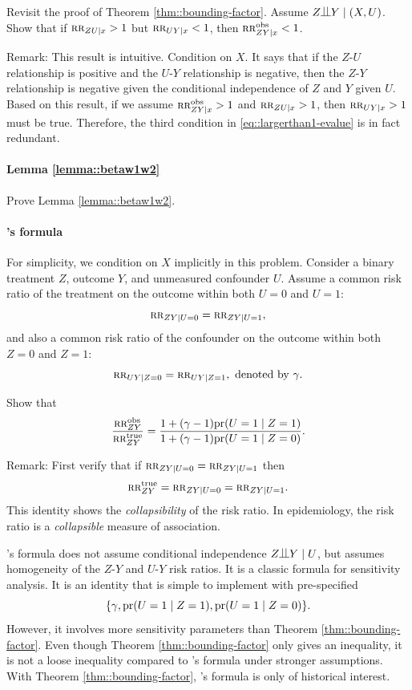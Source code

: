 Revisit the proof of Theorem \ref{thm::bounding-factor}. Assume $Z\ind Y \mid (X, U)$. Show that if $ \textsc{rr}_{ZU\mid x} > 1$ but $ \textsc{rr}_{UY\mid x} < 1$, then $\textsc{rr}_{ZY\mid x}^{\textup{obs}} < 1$. 


Remark: 
This result is intuitive. Condition on $X.$ It says that if the $Z$-$U$ relationship is positive and the $U$-$Y$ relationship is negative, then the $Z$-$Y$ relationship is negative given the conditional independence of $Z$ and $Y$ given $U$. 
Based on this result, if we assume $\textsc{rr}_{ZY\mid x}^{\textup{obs}} > 1$ and $ \textsc{rr}_{ZU\mid x} > 1$, then $ \textsc{rr}_{UY\mid x} > 1$ must be true. 
Therefore, the third condition in \eqref{eq::largerthan1-evalue} is in fact redundant. 



\paragraph{Lemma \ref{lemma::betaw1w2}}\label{hw::proof-lemma-evalue}

Prove Lemma \ref{lemma::betaw1w2}.

\paragraph{\citet{Schlesselman::1978}'s formula}\label{hw::Schlesselman1978formula}

For simplicity, we condition on $X$ implicitly in this problem. 
Consider a binary treatment $Z$, outcome $Y$, and unmeasured confounder $U$.
Assume a common risk ratio of the treatment on the outcome within both $U=0$ and $U=1$:
$$
 \textsc{rr}_{ZY|U=0} = \textsc{rr}_{ZY|U=1}, 
$$
and also a common risk ratio of the confounder on the outcome within both $Z=0$ and $Z=1$:
$$  
\textsc{rr}_{UY|Z=0} = \textsc{rr}_{UY|Z=1} , \text{ denoted by }\gamma.
$$

Show that  
$$
\frac{\textsc{rr}_{ZY}^{\textup{obs}}}{  \textsc{rr}_{ZY}^{\textup{true}} } = \frac{1 + (  \gamma  -1)\textup{pr}(U=1\mid Z=1)  }
{ 1 + (  \gamma -1)\textup{pr}(U=1\mid Z=0) } .
$$ 




Remark: First verify that if  $\textsc{rr}_{ZY|U=0} = \textsc{rr}_{ZY|U=1}$ then 
$$
\textsc{rr}_{ZY}^{\textup{true}}  = \textsc{rr}_{ZY|U=0} = \textsc{rr}_{ZY|U=1} . 
$$
This identity shows the {\it collapsibility} of the risk ratio. 
In epidemiology, the risk ratio is a {\it collapsible} measure of association.


 
\citet{Schlesselman::1978}'s formula does not assume conditional independence $Z\ind Y\mid U$, but assumes homogeneity of the $Z$-$Y$ and $U$-$Y$ risk ratios. It is a classic formula for sensitivity analysis. It is an identity that is simple to implement with pre-specified
$$
\{   \gamma  ,  \textup{pr}(U=1\mid Z=1), \textup{pr}(U=1\mid Z=0)  \} .
$$
However, it involves more sensitivity parameters than Theorem \ref{thm::bounding-factor}. Even though Theorem \ref{thm::bounding-factor} only gives an inequality, it is not a loose inequality compared to \citet{Schlesselman::1978}'s formula under stronger assumptions. With Theorem \ref{thm::bounding-factor},  \citet{Schlesselman::1978}'s formula is only of historical interest. 



